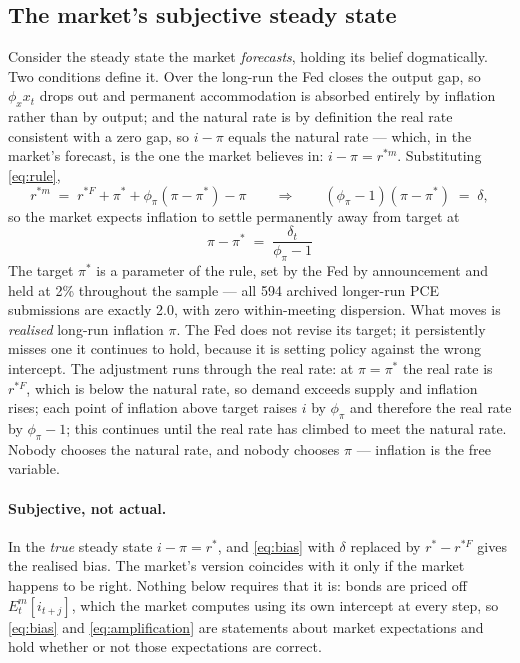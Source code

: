 \documentclass[11pt]{article}
\begin{document}
\subsection{The market's subjective steady state}
Consider the steady state the market \emph{forecasts}, holding its belief dogmatically. Two
conditions define it. Over the long-run the Fed closes the output gap, so $\phi_x x_t$ drops
out and permanent accommodation is absorbed entirely by inflation rather than by output; and the
natural rate is by definition the real rate consistent with a zero gap, so $i-\pi$ equals the
natural rate --- which, in the market's forecast, is the one the market believes in:
$i - \pi = r^{*m}$. Substituting \eqref{eq:rule},
\[
r^{*m} \;=\; r^{*F} + \pi^{*} + \phi_\pi(\pi-\pi^{*}) - \pi
\qquad\Longrightarrow\qquad
\left(\phi_\pi-1\right)\left(\pi-\pi^{*}\right) \;=\; \delta ,
\]
so the market expects inflation to settle permanently away from target at
\begin{equation}
\boxed{\;\pi - \pi^{*} \;=\; \frac{\delta_t}{\phi_\pi - 1}\;}
\label{eq:bias}
\end{equation}
The target $\pi^{*}$ is a parameter of the
rule, set by the Fed by announcement and held at 2\% throughout the sample --- all 594 archived
longer-run PCE submissions are exactly 2.0, with zero within-meeting dispersion. What moves is
\emph{realised} long-run inflation $\pi$. The Fed does not revise its target; it persistently
misses one it continues to hold, because it is setting policy against the wrong intercept. The
adjustment runs through the real rate: at $\pi=\pi^{*}$ the real rate is $r^{*F}$, which is below
the natural rate, so demand exceeds supply and inflation rises; each point of inflation above
target raises $i$ by $\phi_\pi$ and therefore the real rate by $\phi_\pi-1$; this continues until
the real rate has climbed to meet the natural rate. Nobody chooses the natural rate, and nobody
chooses $\pi$ --- inflation is the free variable.
\paragraph{Subjective, not actual.} In the \emph{true} steady state $i-\pi = r^{*}$, and
\eqref{eq:bias} with $\delta$ replaced by $r^{*}-r^{*F}$ gives the realised bias. The market's
version coincides with it only if the market happens to be right. Nothing below requires that it
is: bonds are priced off $E^{m}_t[i_{t+j}]$, which the market computes using its own intercept at
every step, so \eqref{eq:bias} and \eqref{eq:amplification} are statements about market
expectations and hold whether or not those expectations are correct.
\end{document}
